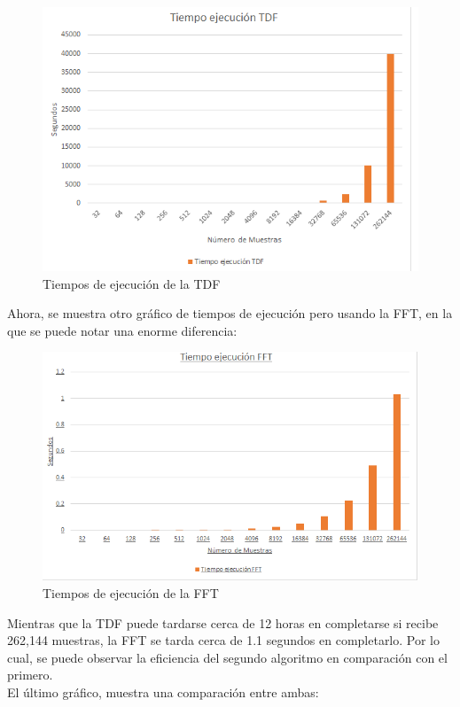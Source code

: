 \begin{figure}[H]
	\centering
	\includegraphics[scale=1]{img/tiempo_tdf.png}
	\caption{Tiempos de ejecución de la TDF}
	\label{fig:prebSDa2}		
\end{figure}
Ahora, se muestra otro gráfico de tiempos de ejecución pero usando la FFT, en la que se puede notar una enorme diferencia:
\begin{figure}[H]
	\centering
	\includegraphics[scale=.88]{img/tiempo_fft.png}
	\caption{Tiempos de ejecución de la FFT}
	\label{fig:prebsdSDa2}		
\end{figure}
Mientras que la TDF puede tardarse cerca de 12 horas en completarse si recibe 262,144 muestras, la FFT se tarda cerca de 1.1 segundos en completarlo. Por lo cual, se puede observar la eficiencia del segundo algoritmo en comparación con el primero.\\
El último gráfico, muestra una comparación entre ambas:
